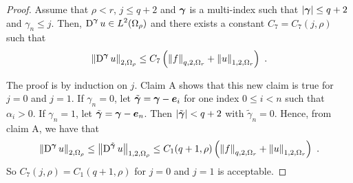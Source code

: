 \begin{proof}
 Assume that $\rho<r$, $j\leq q+2$ and
${\bm{\gamma}}$ is a multi-index such that $|{\bm{\gamma}}|\leq q+2$ and
$\gamma_n \leq j$.  Then,
$\displaystyle \operatorname{D}^{{\bm{\gamma}}} u \in L^2(\Omega_\rho)$ and there
exists a constant $C_7=C_7(j,\rho)$ such that
\begin{equation} \label{ell_claim2a}
\left\|\operatorname{D}^{{\bm{\gamma}}} u \right\|_{2,\Omega_\rho} \leq C_7 \left(
\left\|f\right\|_{q,2,\Omega_r} + \left\|u\right\|_{1,2,\Omega_r} \right) \ .
\end{equation}

The proof is by induction on $j$.  Claim A shows
that this new claim is true for $j=0$ and $j=1$.  If $\gamma_n=0$, let
$\tilde{{\bm{\gamma}}} = {\bm{\gamma}} - {\bm{e}}_i$ for one index $0\leq i <n$
such that $\alpha_i>0$.  If $\gamma_n=1$, let
$\tilde{{\bm{\gamma}}} = {\bm{\gamma}} - {\bm{e}}_n$.
Then $|\tilde{{\bm{\gamma}}}|<q+2$ with $\tilde{\gamma}_n =0$.  Hence, from
claim A, we have that
\[
\left\|\operatorname{D}^{{\bm{\gamma}}} u \right\|_{2,\Omega_\rho}
\leq \left\|\operatorname{D}^{\tilde{{\bm{\gamma}}}} u \right\|_{1,2,\Omega_\rho}
\leq C_1(q+1,\rho) \left( \left\|f\right\|_{q,2,\Omega_r}
+ \left\|u\right\|_{1,2,\Omega_r} \right) \ .
\]
So $C_7(j,\rho) = C_1(q+1,\rho)$ for $j=0$ and $j=1$ is acceptable. 


\end{proof}
